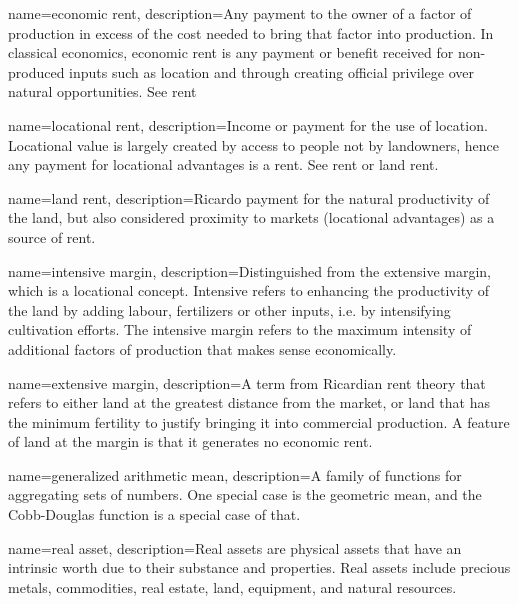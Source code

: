 {
name=economic rent,
description={Any payment to the owner of a factor of production in excess of the cost needed to bring that factor into production. In classical economics, economic rent is any payment or benefit received for non-produced inputs such as location and through creating official privilege over natural opportunities. See \gls{rent}}
}

{
name=locational rent,
description={Income or payment for the use of location. Locational value is largely created by access to people not by landowners, hence any payment for locational advantages is a rent. See \gls{rent} or \gls{land rent}.}
}

{
name=land rent,
description={Ricardo payment for  the natural productivity of the land, but also considered proximity to markets (locational advantages) as a source of rent. }
}

{
name=intensive margin,
description={Distinguished from the \gls{extensive margin}, which is a locational concept. Intensive refers to enhancing the productivity of the land by adding labour, fertilizers or other inputs, i.e. by intensifying cultivation efforts.  The intensive margin refers to the maximum intensity of additional factors of production that makes sense economically. }
}

{
name=extensive margin,
description={A term from Ricardian rent theory that refers to either land at the greatest distance from the market, or land that has the minimum fertility to justify bringing it into commercial production. A feature of land at the margin is that it generates no \gls{economic rent}.}
}

{
name=generalized arithmetic mean,
description={A family of functions for aggregating sets of numbers. One special case is the geometric mean,  and the Cobb-Douglas function is a special case of that.} %
}


{
name=real asset, 
description={Real assets are physical assets that have an intrinsic worth due to their substance and properties. Real assets include precious metals, commodities, real estate, land, equipment, and natural resources. }
}



